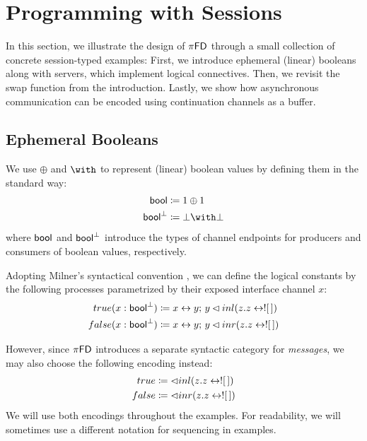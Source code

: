 \chapter{Programming with Sessions}\label{ch:programming-with-sessions}

In this section, we illustrate the design of $\pi\textsf{FD}$ through a small collection
of concrete session-typed examples: First, we introduce ephemeral (linear) booleans
along with servers, which implement logical connectives. Then, we revisit
the swap function from the introduction. Lastly, we show how asynchronous
communication can be encoded using continuation channels as a buffer.

\section{Ephemeral Booleans}
We use $\oplus$ and $\with$ to represent (linear) boolean values by defining them
in the standard way:
\begin{align*}
  \bool &\coloneq 1 \oplus 1 \\
  \cobool &\coloneq \bot \with \bot
\end{align*}
where $\textsf{bool}$ and $\textsf{bool}^\bot$ introduce the types of channel endpoints for
producers and consumers of boolean values, respectively.

Adopting Milner's syntactical convention \cite{Milner1992:PiCalculus}, we can define the logical
constants by the following processes parametrized by their exposed interface channel $x$:
\begin{align*}
  true(x : \textsf{bool}^\bot) &\coloneq x \leftrightarrow y ;\, y \lhd inl(z.z \leftrightarrow ! [\,]) \\
  false(x : \textsf{bool}^\bot) &\coloneq x \leftrightarrow y ;\, y \lhd inr(z.z \leftrightarrow ! [\,])
\end{align*}

However, since $\pi\textsf{FD}$ introduces a separate syntactic category for \emph{messages},
we may also choose the following encoding instead:
\begin{align*}
  true &\coloneq \lhd inl(z.z \leftrightarrow ! [\,]) \\
  false &\coloneq \lhd inr(z.z \leftrightarrow ! [\,])
\end{align*}
We will use both encodings throughout the examples.
For readability, we will sometimes use a different notation for sequencing in examples.

